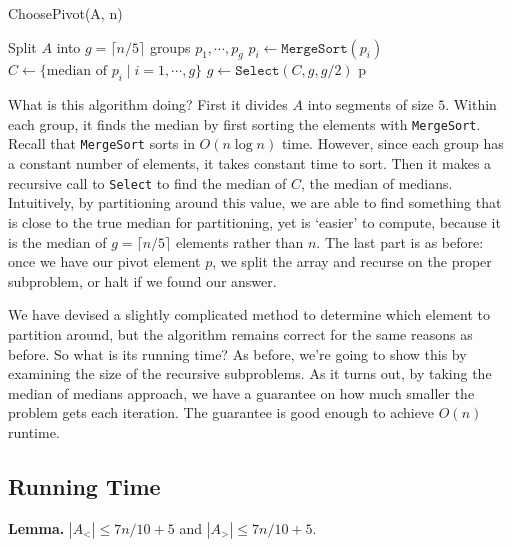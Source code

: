 \documentclass [12pt]{article}
\begin{document}
\begin{algorithm}
\caption{ChoosePivot(A, n)}\label{alg:choose_pivot}
\begin{algorithmic}
\STATE Split $A$ into $g = \lceil n / 5 \rceil$ groups $p_1, \cdots, p_g$
    \STATE $p_i \gets \texttt{MergeSort}(p_i)$
\ENDFOR
\STATE $C \gets \{ \text{median of } p_i \mid i = 1, \cdots, g \}$
\STATE $g \gets \texttt{Select}(C, g, g/2)$
\RETURN p
\end{algorithmic}
\end{algorithm}

What is this algorithm doing? First it divides $A$ into segments of size $5$. Within each group, it finds the median by first sorting the elements with \texttt{MergeSort}. Recall that \texttt{MergeSort} sorts in $O(n \log n)$ time. However, since each group has a constant number of elements, it takes constant time to sort. Then it makes a recursive call to \texttt{Select} to find the median of $C$, the median of medians. Intuitively, by partitioning around this value, we are able to find something that is close to the true median for partitioning, yet is `easier' to compute, because it is the median of $g = \lceil n/5 \rceil$ elements rather than $n$. The last part is as before: once we have our pivot element $p$, we split the array and recurse on the proper subproblem, or halt if we found our answer. 

We have devised a slightly complicated method to determine which element to partition
around, but the algorithm remains correct for the same reasons as before. So what is its running time? As before, we're going to show this by examining the size of the recursive subproblems. As it turns out, by taking the median of medians approach, we have a guarantee on how much smaller the problem gets each iteration. The guarantee is good enough to achieve $O(n)$ runtime.

\subsection{Running Time}

\textbf{Lemma.} $|A_<| \leq 7n/10 + 5$ and $|A_>| \leq 7n/10 + 5$.
\end{document}
